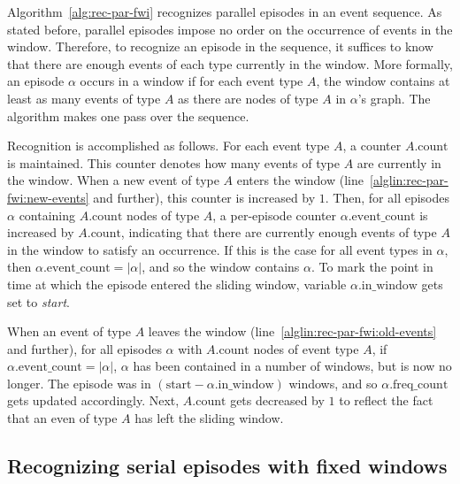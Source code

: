 Algorithm~\ref{alg:rec-par-fwi} recognizes parallel episodes in an event sequence. As stated before, parallel episodes impose no order on the occurrence of events in the window. Therefore, to recognize an episode in the sequence, it suffices to know that there are enough events of each type currently in the window. More formally, an episode $ \alpha $ occurs in a window if for each event type $ A $, the window contains at least as many events of type $ A $ as there are nodes of type $ A $ in $ \alpha $'s graph. The algorithm makes one pass over the sequence.

Recognition is accomplished as follows. For each event type $ A $, a counter $ A \text{.count} $ is maintained. This counter denotes how many events of type $ A $ are currently in the window. When a new event of type $ A $ enters the window (line~\ref{alglin:rec-par-fwi:new-events} and further), this counter is increased by $ 1 $. Then, for all episodes $ \alpha $ containing $ A \text{.count} $ nodes of type $ A $, a per-episode counter $ \alpha \text{.event\_count} $ is increased by $ A \text{.count} $, indicating that there are currently enough events of type $ A $ in the window to satisfy an occurrence. If this is the case for all event types in $ \alpha $, then $ \alpha \text{.event\_count} = | \alpha | $, and so the window contains $ \alpha $. To mark the point in time at which the episode entered the sliding window, variable $ \alpha \text{.in\_window} $ gets set to \emph{start}.

When an event of type $ A $ leaves the window (line~\ref{alglin:rec-par-fwi:old-events} and further), for all episodes $ \alpha $ with $ A \text{.count} $ nodes of event type $ A $, if $ \alpha \text{.event\_count} = | \alpha | $, $ \alpha $ has been contained in a number of windows, but is now no longer. The episode was in $ (\text{start} - \alpha \text{.in\_window}) $ windows, and so $ \alpha \text{.freq\_count} $ gets updated accordingly. Next, $ A \text{.count} $ gets decreased by $ 1 $ to reflect the fact that an even of type $ A $ has left the sliding window.

\subsection{Recognizing serial episodes with fixed windows}

